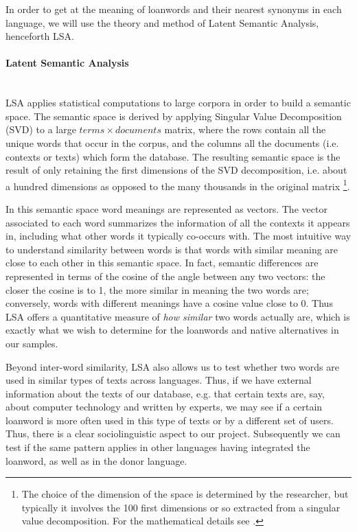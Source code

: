 \documentclass[a4paper]{article}
\begin{document}
In order to get at the meaning of loanwords and their nearest synonyms in each language, we will use the theory and method of Latent Semantic Analysis, henceforth LSA.

\paragraph{Latent Semantic Analysis} \hspace{0pt} \\
LSA  \citep{Deerwester1990,Landauer1998,Dumais2004}  applies statistical computations to large corpora in order to build a semantic space.
The semantic space is derived by applying Singular Value Decomposition (SVD) to a large $ terms \times documents$ matrix, where the rows contain all the unique words that occur in the corpus, and the columns all the documents (i.e. contexts or texts) which form the database.
The resulting semantic space is the result of only retaining the first dimensions of the SVD decomposition, i.e. about a hundred dimensions as opposed to the many thousands in the original matrix%
\footnote{The choice of the dimension of the space is determined by the researcher, but typically it involves the 100 first dimensions or so extracted from a singular value decomposition. For the mathematical details see \citet{Deerwester1990}.}.

In this semantic space word meanings are represented as vectors.
The vector associated to each word summarizes the information of all the contexts it appears in, including what other words it typically co-occurs with.
The most intuitive way to understand similarity between words is that words with similar meaning are close to each other in this semantic space.
In fact, semantic differences are represented in terms of the cosine of the angle between any two vectors: the closer the cosine is to 1, the more similar in meaning the two words are; conversely, words with different meanings have a cosine value close to 0. 
Thus LSA offers a quantitative measure of \emph{how similar} two words actually are, which is exactly what we wish to determine for the loanwords and native alternatives in our samples.

Beyond inter-word similarity, LSA also allows us to test whether two words are used in similar types of texts across languages.
Thus, if we have external information about the texts of our database, e.g. that certain texts are, say, about computer technology and written by experts, we may see if a certain loanword is more often used in this type of texts or by a different set of users. 
Thus, there is a clear sociolinguistic aspect to our project.
Subsequently we can test if the same pattern applies in other languages having integrated the loanword, as well as in the donor language. 
\end{document}
